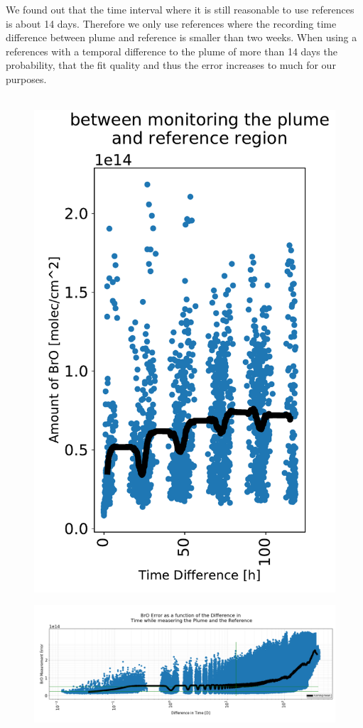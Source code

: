 \documentclass  [
  paper    = a4,
  BCOR     = 10mm,
  twoside,
  fontsize = 12pt,
  fleqn,
  toc      = bibnumbered,
  toc      = listofnumbered,
  numbers  = noendperiod,
  headings = normal,
  listof   = leveldown,
  version  = 3.03
]                                       {scrreprt}
\begin{document}
	We found out that the time interval where it is still reasonable to use references is about 14 days. Therefore we only use references where the recording time difference between plume and reference is smaller than two weeks. When using a references with a temporal difference to the plume of more than 14 days the probability, that the fit quality and thus the  error increases to much for our purposes. \\
	\\
	\begin{figure}
		\centering
		\includegraphics[width=0.7\linewidth]{Bilder/Datum_100h}
		\caption{}
		\label{fig:datum100h}
	\end{figure}	
	\begin{figure}[h!]
		\includegraphics[width=1.1\linewidth]{Bilder/Datum}
		\caption{}
		\label{fig:dat}
	\end{figure}
\end{document}
